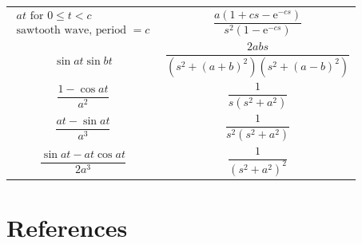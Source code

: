 \documentclass[
]{book}
\begin{document}
\begin{longtable}[]{@{}ll@{}}
\begin{minipage}[t]{0.42\columnwidth}
\begin{align} at \text{ for } 0 \leq t  <  c \\ \text{sawtooth wave, period } = c \end{align}\strut
\end{minipage} & \begin{minipage}[t]{0.52\columnwidth}\raggedright
\[ \frac{a \left( 1 + cs - \mathrm{e}^{-cs} \right) }{s^2 \left( 1 - \mathrm{e}^{-cs} \right) }\]\strut
\end{minipage}\tabularnewline
\begin{minipage}[t]{0.42\columnwidth}\raggedright
\[\sin{at} \sin{bt} \]\strut
\end{minipage} & \begin{minipage}[t]{0.52\columnwidth}\raggedright
\[ \frac{2abs}{\left( s^2 + \left(a+b\right)^2\right) \left( s^2 + \left(a-b\right)^2\right)} \]\strut
\end{minipage}\tabularnewline
\begin{minipage}[t]{0.42\columnwidth}\raggedright
\[\frac{1 - \cos{at}}{a^2}  \]\strut
\end{minipage} & \begin{minipage}[t]{0.52\columnwidth}\raggedright
\[ \frac{1}{s \left( s^2 + a^2 \right) } \]\strut
\end{minipage}\tabularnewline
\begin{minipage}[t]{0.42\columnwidth}\raggedright
\[\frac{at - \sin{at}}{a^3}  \]\strut
\end{minipage} & \begin{minipage}[t]{0.52\columnwidth}\raggedright
\[ \frac{1}{s^2 \left( s^2 + a^2 \right) } \]\strut
\end{minipage}\tabularnewline
\begin{minipage}[t]{0.42\columnwidth}\raggedright
\[\frac{\sin{at} - at\cos{at}}{2a^3}  \]\strut
\end{minipage} & \begin{minipage}[t]{0.52\columnwidth}\raggedright
\[ \frac{1}{\left( s^2 + a^2 \right)^2 } \]\strut
\end{minipage}\tabularnewline
\bottomrule
\end{longtable}

\hypertarget{references-1}{%
\section{References}\label{references-1}}
\end{document}
